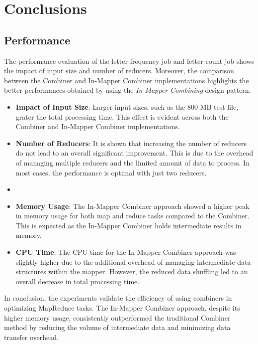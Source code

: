 \newpage
\section{Conclusions}

\subsection{Performance}

The performance evaluation of the letter frequency job and letter count job shows the impact of input size and number of reducers. Moreover, the comparison between the Combiner and In-Mapper Combiner implementations highlights the better performances obtained by using the \textit{In-Mapper Combining} design pattern.

\begin{itemize}
\item \textbf{Impact of Input Size}: Larger input sizes, such as the 800 MB test file, grater the total processing time. This effect is evident across both the Combiner and In-Mapper Combiner implementations.
\item \textbf{Number of Reducers}: It is shown that increasing the number of reducers do not lead to an overall significant improvement. This is due to the overhead of managing multiple reducers and the limited amount of data to process. In most cases, the performance is optimal with just two reducers.
\item 
\item \textbf{Memory Usage}: The In-Mapper Combiner approach showed a higher peak in memory usage for both map and reduce tasks compared to the Combiner. This is expected as the In-Mapper Combiner holds intermediate results in memory.

\item \textbf{CPU Time}: The CPU time for the In-Mapper Combiner approach was slightly higher due to the additional overhead of managing intermediate data structures within the mapper. However, the reduced data shuffling led to an overall decrease in total processing time.
\end{itemize}

\noindent In conclusion, the experiments validate the efficiency of using combiners in optimizing MapReduce tasks. The In-Mapper Combiner approach, despite its higher memory usage, consistently outperformed the traditional Combiner method by reducing the volume of intermediate data and minimizing data transfer overhead. 


